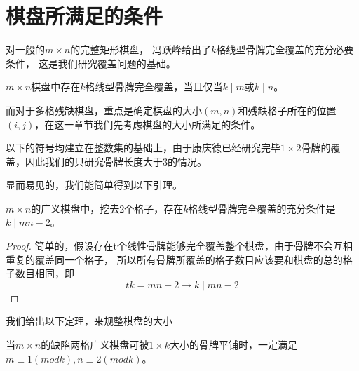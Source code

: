 \chapter{棋盘所满足的条件}

对一般的$m \times n$的完整矩形棋盘， 冯跃峰\cite{fengBasicTheorem}给出了$k$格线型骨牌完全覆盖的充分必要条件， 这是我们研究覆盖问题的基础。

\begin{lemma}
    \label{basic-lemma-1}
    $m \times n$棋盘中存在$k$格线型骨牌完全覆盖，当且仅当$k \mid m$或$k \mid n$。
\end{lemma}

而对于多格残缺棋盘，重点是确定棋盘的大小$(m, n)$和残缺格子所在的位置$(i, j)$，在这一章节我们先考虑棋盘的大小所满足的条件。

以下的符号均建立在整数集的基础上，由于康庆德已经研究完毕$1 \times 2$骨牌的覆盖\cite{ZRZZ199205013}，因此我们的只研究骨牌长度大于3的情况。

显而易见的，我们能简单得到以下引理。
\begin{lemma}
    \label{basic-lemma-2}
    $m \times n$的广义棋盘中，挖去2个格子，存在$k$格线型骨牌完全覆盖的充分条件是$k \mid mn - 2$。
\end{lemma}
\begin{proof}
    简单的，假设存在t个线性骨牌能够完全覆盖整个棋盘，由于骨牌不会互相重复的覆盖同一个格子，
    所以所有骨牌所覆盖的格子数目应该要和棋盘的总的格子数目相同，即
    \begin{equation}
        tk = mn - 2 \rightarrow k \mid mn - 2
    \end{equation}
\end{proof}
我们给出以下定理，来规整棋盘的大小
\begin{theorem}
    \label{basic-theorem-1}
    当$m \times n$的缺陷两格广义棋盘可被$1 \times k$大小的骨牌平铺时，一定满足$m \equiv 1 (mod k), n \equiv 2 (mod k)$。
\end{theorem}

